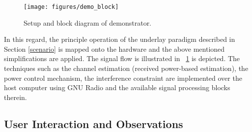 \begin{figure}
%                

	\texttt{[image: figures/demo\_block]}
	\caption{Setup and block diagram of demonstrator.}
	\label{fig:BD}
\end{figure}
\fi
In this regard, the principle operation of the underlay paradigm described in Section \ref{scenario} is mapped onto the hardware and the above mentioned simplifications are applied. The signal flow is illustrated in \figurename~\ref{fig:BD} is depicted. The techniques such as the channel estimation (received power-based estimation), the power control mechanism, the interference constraint are implemented over the host computer using GNU Radio and the available signal processing blocks therein.


\subsection{User Interaction and Observations}

